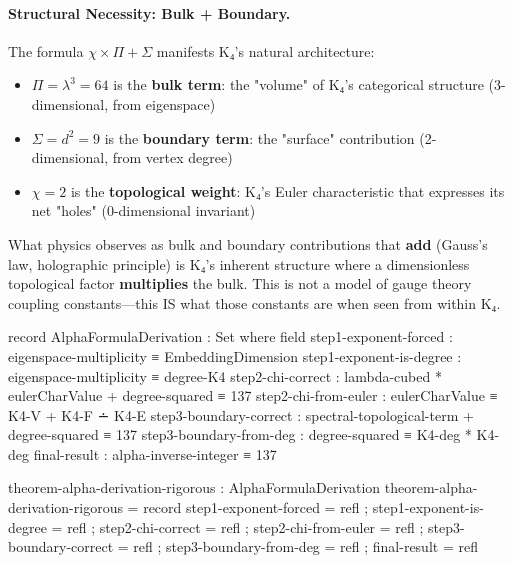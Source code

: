 \documentclass[11pt,a4paper]{book}
\begin{document}

\paragraph{Structural Necessity: Bulk + Boundary.}

The formula $\chi \times \Pi + \Sigma$ manifests K₄'s natural architecture:

\begin{itemize}
\item $\Pi = \lambda^3 = 64$ is the \textbf{bulk term}: the "volume" of K₄'s categorical structure (3-dimensional, from eigenspace)
\item $\Sigma = d^2 = 9$ is the \textbf{boundary term}: the "surface" contribution (2-dimensional, from vertex degree)
\item $\chi = 2$ is the \textbf{topological weight}: K₄'s Euler characteristic that expresses its net "holes" (0-dimensional invariant)
\end{itemize}

What physics observes as bulk and boundary contributions that \textbf{add} (Gauss's law, holographic principle) is K₄'s inherent structure where a dimensionless topological factor \textbf{multiplies} the bulk. This is not a model of gauge theory coupling constants—this IS what those constants are when seen from within K₄.

\begin{code}
record AlphaFormulaDerivation : Set where
  field
    step1-exponent-forced     : eigenspace-multiplicity ≡ EmbeddingDimension
    step1-exponent-is-degree  : eigenspace-multiplicity ≡ degree-K4
    step2-chi-correct         : lambda-cubed * eulerCharValue + degree-squared ≡ 137
    step2-chi-from-euler      : eulerCharValue ≡ K4-V + K4-F ∸ K4-E
    step3-boundary-correct    : spectral-topological-term + degree-squared ≡ 137
    step3-boundary-from-deg   : degree-squared ≡ K4-deg * K4-deg
    final-result              : alpha-inverse-integer ≡ 137

theorem-alpha-derivation-rigorous : AlphaFormulaDerivation
theorem-alpha-derivation-rigorous = record
  { step1-exponent-forced   = refl
  ; step1-exponent-is-degree = refl
  ; step2-chi-correct       = refl
  ; step2-chi-from-euler    = refl
  ; step3-boundary-correct  = refl
  ; step3-boundary-from-deg = refl
  ; final-result            = refl
  }
\end{code}
\end{document}
